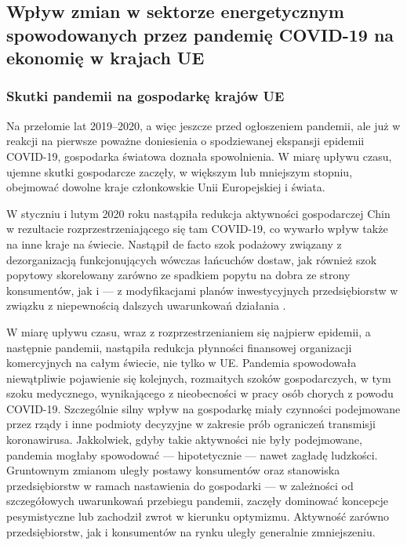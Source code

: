 \documentclass[polish, twoside, 12pt, a4paper]{article}
\theoremstyle{definition}
\theoremstyle{plain}
\theoremstyle{remark}
\begin{document}
\subsection{Wpływ zmian w sektorze energetycznym spowodowanych przez pandemię COVID-19 na ekonomię w krajach UE}

\subsubsection{Skutki pandemii na gospodarkę krajów UE}

Na przełomie lat 2019--2020, a więc jeszcze przed ogłoszeniem pandemii, ale już w reakcji na pierwsze poważne doniesienia o spodziewanej ekspansji epidemii COVID-19, gospodarka światowa doznała spowolnienia. W miarę upływu czasu, ujemne skutki gospodarcze zaczęły, w większym lub mniejszym stopniu, obejmować dowolne kraje członkowskie Unii Europejskiej i świata.  

W styczniu i lutym 2020 roku nastąpiła redukcja aktywności gospodarczej Chin w rezultacie rozprzestrzeniającego się tam COVID-19, co wywarło wpływ także na inne kraje na świecie. Nastąpił de facto szok podażowy związany z dezorganizacją funkcjonujących wówczas łańcuchów dostaw, jak również szok popytowy skorelowany zarówno ze spadkiem popytu na dobra ze strony konsumentów, jak i --- z modyfikacjami planów inwestycyjnych przedsiębiorstw w związku z niepewnością dalszych uwarunkowań działania \parencite{dziembala2021}. 

W miarę upływu czasu, wraz z rozprzestrzenianiem się najpierw epidemii, a następnie pandemii, nastąpiła redukcja płynności finansowej organizacji komercyjnych na całym świecie, nie tylko w UE. Pandemia spowodowała niewątpliwie pojawienie się kolejnych, rozmaitych szoków gospodarczych, w tym szoku medycznego, wynikającego z nieobecności w pracy osób chorych z powodu COVID-19. Szczególnie silny wpływ na gospodarkę miały czynności podejmowane przez rządy i inne podmioty decyzyjne w zakresie prób ograniczeń transmisji koronawirusa. Jakkolwiek, gdyby takie aktywności nie były podejmowane, pandemia mogłaby spowodować --- hipotetycznie --- nawet zagładę ludzkości. Gruntownym zmianom uległy postawy konsumentów oraz stanowiska przedsiębiorstw w ramach nastawienia do gospodarki --- w zależności od szczegółowych uwarunkowań przebiegu pandemii, zaczęły dominować koncepcje pesymistyczne lub zachodził zwrot w kierunku optymizmu. Aktywność zarówno przedsiębiorstw, jak i konsumentów na rynku uległy generalnie zmniejszeniu. 
\end{document}
